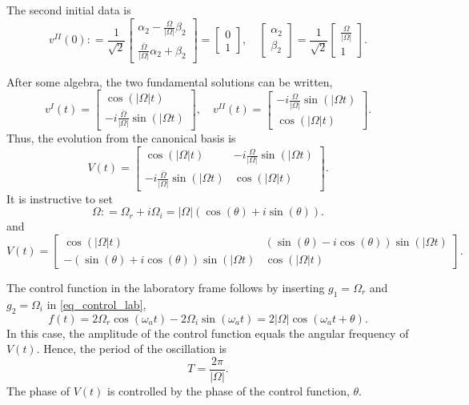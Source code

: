 \documentclass[11pt]{article}
\begin{document}
The second initial data is
\[
v^{II}(0) : =
%
\frac{1}{\sqrt{2}}
\begin{bmatrix}
  \alpha_2 - \frac{\Omega}{|\Omega|} \beta_2 \\
  \frac{\bar{\Omega}}{|\Omega|} \alpha_2 + \beta_2
\end{bmatrix} = \begin{bmatrix} 0 \\ 1 \end{bmatrix},
%
\quad
\begin{bmatrix}
\alpha_2\\ \beta_2
\end{bmatrix}=
\frac{1}{\sqrt{2}}
\begin{bmatrix}
\frac{\Omega}{|\Omega|} \\ 1
\end{bmatrix}.
\]

After some algebra, the two fundamental solutions can be written,
\[
v^{I}(t) =
\begin{bmatrix}
  \cos(|\Omega| t)\\
  -i\frac{\bar{\Omega}}{|\Omega|} \sin(|\Omega t)
\end{bmatrix},\quad
%
v^{II}(t) =
\begin{bmatrix}
  -i\frac{\Omega}{|\Omega|} \sin(|\Omega t)\\
  \cos(|\Omega| t) 
\end{bmatrix}.
\]
Thus, the evolution from the canonical basis is
\[
V(t) =
\begin{bmatrix}
  \cos(|\Omega| t) &  -i\frac{\Omega}{|\Omega|} \sin(|\Omega t)\\
  -i\frac{\bar{\Omega}}{|\Omega|} \sin(|\Omega t) &  \cos(|\Omega| t) 
\end{bmatrix}.
\]
It is instructive to set 
\begin{equation}\label{eq_omega-phase}
\Omega: = \Omega_r + i \Omega_i = |\Omega|(\cos(\theta) + i\sin(\theta)).
\end{equation}
and
\[
V(t) =
\begin{bmatrix}
  \cos(|\Omega| t) &  (\sin(\theta) -i\cos(\theta) ) \sin(|\Omega t)\\
  -(\sin(\theta) + i\cos(\theta)) \sin(|\Omega t) &  \cos(|\Omega| t) 
\end{bmatrix}.
\]

The control function in the laboratory frame follows by inserting $g_1=\Omega_r$ and $g_2=\Omega_i$
in \eqref{eq_control_lab},
\begin{equation}
  f(t) = 2\Omega_r \cos(\omega_a t) - 2\Omega_i \sin(\omega_a t)
  = 2|\Omega| \cos(\omega_a t + \theta).
\end{equation}
In this case, the amplitude of the control function equals the angular frequency of $V(t)$. Hence,
the period of the oscillation is
\[
T = \frac{2\pi}{|\Omega|}.
\]
The phase of $V(t)$ is controlled by the phase of the control function, $\theta$.
\end{document}
